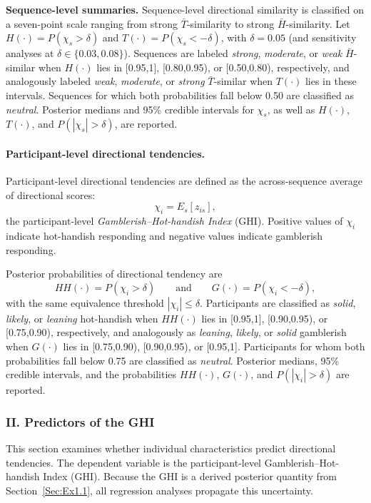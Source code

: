 \documentclass[11pt,a4paper]{article}
\numberwithin{equation}{section}
\begin{document}
\textbf{Sequence-level summaries.}
Sequence-level directional similarity is classified on a seven-point scale
ranging from strong \(\bar{T}\)-similarity to strong \(\bar{H}\)-similarity. Let
\(H(\cdot)=P(\chi_s>\delta)\) and \(T(\cdot)=P(\chi_s<-\delta)\), with
\(\delta=0.05\) (and sensitivity analyses at
\(\delta\in\{0.03,0.08\}\)). Sequences are labeled \emph{strong},
\emph{moderate}, or \emph{weak} \(\bar{H}\)-similar when \(H(\cdot)\) lies in
[0.95,1], [0.80,0.95), or [0.50,0.80), respectively, and analogously labeled
\emph{weak}, \emph{moderate}, or \emph{strong} \(\bar{T}\)-similar when
\(T(\cdot)\) lies in these intervals. Sequences for which both probabilities fall
below 0.50 are classified as \emph{neutral}. Posterior medians and 95\%
credible intervals for \(\chi_s\), as well as \(H(\cdot)\), \(T(\cdot)\), and
\(P(|\chi_s|>\delta)\), are reported.

\paragraph{Participant-level directional tendencies.}

Participant-level directional tendencies are defined as the across-sequence
average of directional scores:
\[
\chi_i = E_s[z_{is}],
\]
the participant-level \emph{Gamblerish--Hot-handish Index} (GHI). Positive values
of \(\chi_i\) indicate hot-handish responding and negative values indicate
gamblerish responding.

Posterior probabilities of directional tendency are
\[
HH(\cdot)=P(\chi_i>\delta)
\qquad\text{and}\qquad
G(\cdot)=P(\chi_i<-\delta),
\]
with the same equivalence threshold \(|\chi_i|\le\delta\).
Participants are classified as \emph{solid}, \emph{likely}, or \emph{leaning}
hot-handish when \(HH(\cdot)\) lies in [0.95,1], [0.90,0.95), or [0.75,0.90),
respectively, and analogously as \emph{leaning}, \emph{likely}, or \emph{solid}
gamblerish when \(G(\cdot)\) lies in [0.75,0.90), [0.90,0.95), or [0.95,1].
Participants for whom both probabilities fall below 0.75 are classified as
\emph{neutral}. Posterior medians, 95\% credible intervals, and the probabilities
\(HH(\cdot)\), \(G(\cdot)\), and \(P(|\chi_i|>\delta)\) are reported.
\subsubsection*{II. Predictors of the GHI}
\label{Sec:Ex1.2}

This section examines whether individual characteristics predict directional
tendencies. The dependent variable is the participant-level
Gamblerish--Hot-handish Index (GHI). Because the GHI is a derived posterior
quantity from Section~\ref{Sec:Ex1.1}, all regression analyses propagate this
uncertainty.
\end{document}
